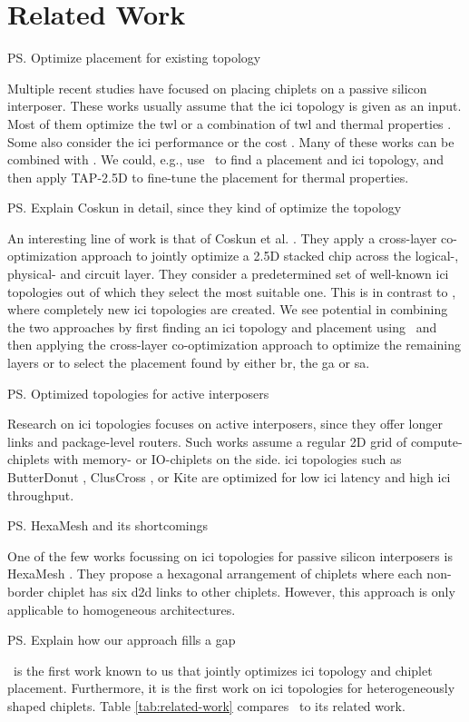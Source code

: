 \section{Related Work}
\label{sec:related-work}

\ps{Optimize placement for existing topology}

Multiple recent studies have focused on placing chiplets on a passive silicon interposer.
These works usually assume that the \gls{ici} topology is given as an input.
Most of them optimize the \gls{twl} \cite{ho, liu, seemuth, osmolovskyi} or a combination of \gls{twl} and thermal properties \cite{chiou, tap25d}.
Some also consider the \gls{ici} performance or the cost \cite{eris}.
Many of these works can be combined with \name. 
We could, e.g., use \name~to find a placement and \gls{ici} topology, and then apply TAP-2.5D \cite{tap25d} to fine-tune the placement for thermal properties. 

\ps{Explain Coskun in detail, since they kind of optimize the topology}

An interesting line of work is that of Coskun et al. \cite{coskun-1, coskun-2}.
They apply a cross-layer co-optimization approach to jointly optimize a 2.5D stacked chip across the logical-, physical- and circuit layer.
They consider a predetermined set of well-known \gls{ici} topologies out of which they select the most suitable one.
This is in contrast to \name, where completely new \gls{ici} topologies are created.
We see potential in combining the two approaches by first finding an \gls{ici} topology and placement using \name~and then applying the cross-layer co-optimization approach to optimize the remaining layers or to select the placement found by either \gls{br}, the \gls{ga} or \gls{sa}.

\ps{Optimized topologies for active interposers}

Research on \gls{ici} topologies focuses on active interposers, since they offer longer links and package-level routers.
Such works assume a regular 2D grid of compute-chiplets with memory- or IO-chiplets on the side.
\gls{ici} topologies such as ButterDonut \cite{butterdonut}, ClusCross \cite{cluscross}, or Kite \cite{kite} are optimized for low \gls{ici} latency and high \gls{ici} throughput.

\ps{HexaMesh and its shortcomings}

One of the few works focussing on \gls{ici} topologies for passive silicon interposers is HexaMesh \cite{hexamesh}.
They propose a hexagonal arrangement of chiplets where each non-border chiplet has six \gls{d2d} links to other chiplets.
However, this approach is only applicable to homogeneous architectures.

\ps{Explain how our approach fills a gap}

\name~is the first work known to us that jointly optimizes \gls{ici} topology and chiplet placement.
Furthermore, it is the first work on \gls{ici} topologies for heterogeneously shaped chiplets.
Table \ref{tab:related-work} compares \name~to its related work.